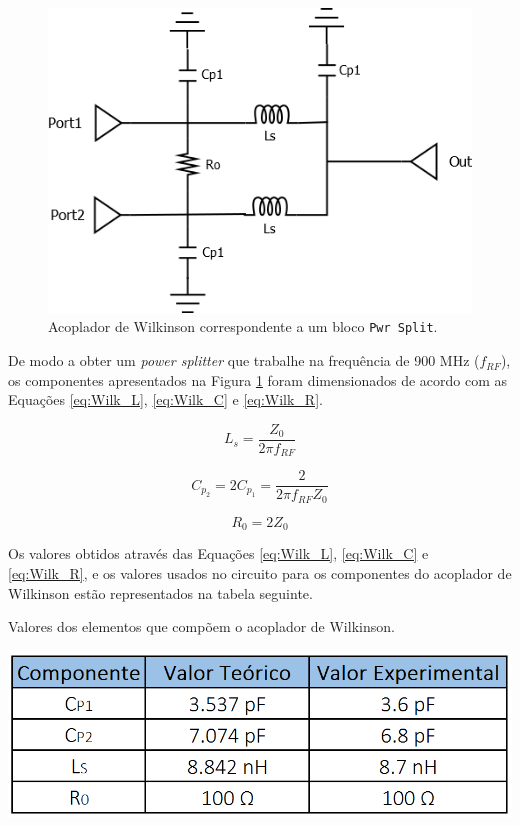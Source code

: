 \documentclass[11pt]{article}
\numberwithin{equation}{section}
\begin{document}
\begin{figure}[h]
\centering
\includegraphics[keepaspectratio=true, scale=0.45]{teoricas/Wilkinson}
\vspace{-0.5em}
\caption{Acoplador de Wilkinson correspondente a um bloco \texttt{Pwr Split}.}
\vspace{-0.8em}
\label{fig:Wilk}
\end{figure}

De modo a obter um \textit{power splitter} que trabalhe na frequência de 900 MHz ($ f_{RF} $), os componentes apresentados na Figura \ref{fig:Wilk} foram dimensionados de acordo com as Equações \ref{eq:Wilk_L}, \ref{eq:Wilk_C} e \ref{eq:Wilk_R}. 

\begin{equation}
L_{s} = \frac{Z_{0}}{2 \pi f_{RF}}
\label{eq:Wilk_L}
\end{equation}

\begin{equation}
C_{p_{2}} = 2C_{p_{1}} = \frac{2}{2 \pi f_{RF}Z_{0}}
\label{eq:Wilk_C}
\end{equation}

\begin{equation}
R_{0}=2Z_{0}
\label{eq:Wilk_R}
\end{equation}

Os valores obtidos através das Equações \ref{eq:Wilk_L}, \ref{eq:Wilk_C} e \ref{eq:Wilk_R}, e os valores usados no circuito para os componentes do acoplador de Wilkinson estão representados na tabela seguinte.

\begin{table}[h]
	\centering
	\caption{Valores dos elementos que compõem o acoplador de Wilkinson.}
	\vspace{-1.5mm}
	\includegraphics[keepaspectratio=true, scale=0.45]{teoricas/componentes4}
\end{table}
\end{document}
